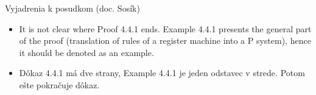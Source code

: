 \begin{frame}[t]{Vyjadrenia k posudkom (doc. Sosík)}
  \begin{itemize}
    \item It is not clear where Proof 4.4.1 ends. Example 4.4.1 presents the general part of the proof (translation of rules of a register machine into a P system), hence it should be denoted as an example.
    \pause
    \item Dôkaz 4.4.1 má dve strany, Example 4.4.1 je jeden odstavec v strede. Potom ešte pokračuje dôkaz.
  \end{itemize}
\end{frame}

